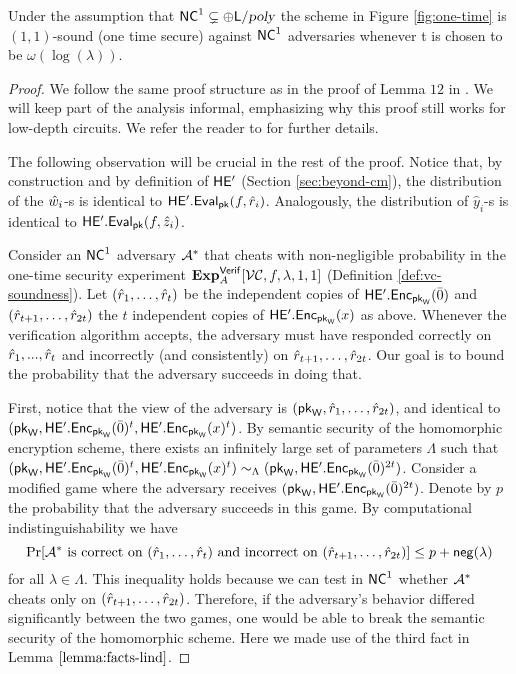 \begin{lemma} 
\label{lemma:one-time}
Under the assumption that ${\mathsf{NC}}^1 \subsetneq \oplus {\ensuremath{\mathsf{L}}} / {\textsl{poly}}$ the  scheme in Figure \ref{fig:one-time} is $(1,1)$-sound (one time secure) against ${\mathsf{NC}}^1$ adversaries whenever t is chosen to be  $\omega(\log(\lambda))$.
\end{lemma}
\begin{proof}
We follow the same proof structure as in the proof of Lemma $12$ in \cite{ckv10}. We will keep part of the analysis informal, emphasizing why this proof still works for low-depth circuits. We refer the reader to \cite{ckv10} for further details.

The following observation will be crucial in the rest of the proof. Notice that, by construction and by definition of $\mathsf{HE'}$ (Section \ref{sec:beyond-cm}), the distribution of the $\hat{w}_i$-s is identical to $\mathsf{HE'.Eval}_{\mathsf{pk}}(f, \hat{r}_i)$. Analogously, the distribution of $\hat{y}_i$-s is identical to $\mathsf{HE'.Eval}_{\mathsf{pk}}(f, \hat{z}_i)$.

Consider an ${\mathsf{NC}}^1$ adversary $\mathcal{A}^*$ that cheats with non-negligible probability in the one-time security experiment ${\bf Exp}^{\mathsf{Verif}}_{A}[{\cal VC}, f, \lambda, 1,1]$ (Definition \ref{def:vc-soundness}).
Let $(\hat{r}_1,\dots,\hat{r}_{t})$ be the independent copies of $\mathsf{HE'.Enc}_{\mathsf{pk}_{\mathsf{W}}}(\bar{0})$ and  $(\hat{r}_{t+1},\dots,\hat{r}_{2t})$ the $t$ independent copies of
$\mathsf{HE'.Enc}_{\mathsf{pk}_{\mathsf{W}}}(x)$ as above. 
Whenever the verification algorithm accepts, the adversary must have responded correctly on $\hat{r}_1,...,\hat{r}_t$ and incorrectly (and consistently) on $\hat{r}_{t+1},\dots,\hat{r}_{2t}$. 
Our goal is to bound the probability that the adversary succeeds in doing that. 

First, notice that the view of the adversary is
$(\mathsf{pk}_{\mathsf{W}}, \hat{r}_1,\dots,\hat{r}_{2t})$, and identical to $(\mathsf{pk}_{\mathsf{W}}, \mathsf{HE'.Enc}_{\mathsf{pk}_{\mathsf{W}}}(\bar{0})^t, \mathsf{HE'.Enc}_{\mathsf{pk}_{\mathsf{W}}}(x)^t)$.
By semantic security of the homomorphic encryption scheme, there exists an infinitely large set of parameters $\Lambda$ such that $ (\mathsf{pk}_{\mathsf{W}}, \mathsf{HE'.Enc}_{\mathsf{pk}_{\mathsf{W}}}(\bar{0})^t, \mathsf{HE'.Enc}_{\mathsf{pk}_{\mathsf{W}}}(x)^t) \sim_{\Lambda} (\mathsf{pk}_{\mathsf{W}}, \mathsf{HE'.Enc}_{\mathsf{pk}_{\mathsf{W}}}(\bar{0})^{2t})$. Consider a modified game where the adversary receives  $(\mathsf{pk}_{\mathsf{W}}, \mathsf{HE'.Enc}_{\mathsf{pk}_{\mathsf{W}}}(\bar{0})^{2t})$. Denote by $p$ the probability that the adversary succeeds in this game. By computational indistinguishability we have
\[
\Pr[\mathcal{A}^* \text{ is correct on } (\hat{r}_1,\dots,\hat{r}_{t}) \text{ and incorrect on } (\hat{r}_{t+1},\dots,\hat{r}_{2t}) ] \leq p + \mathsf{neg}(\lambda)
\]
for all $\lambda \in \Lambda$.
This inequality holds because we can test in ${\mathsf{NC}}^1$ whether $\mathcal{A}^*$ cheats only on $(\hat{r}_{t+1},\dots,\hat{r}_{2t})$. Therefore, if the adversary's behavior differed significantly between the two games, one would be able to break the semantic security of the homomorphic scheme. Here we made use of the third fact in Lemma $\ref{lemma:facts-lind}$.


\end{proof}
